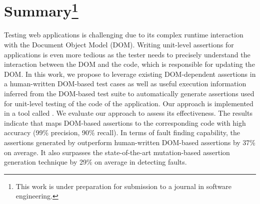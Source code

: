 \section*{Summary\footnote{This work is under preparation for submission to a journal in software engineering.}}
Testing \javascript web applications is challenging due to its complex runtime interaction with the Document Object Model (DOM). Writing unit-level assertions for \javascript applications is even more tedious as the tester needs to precisely understand the interaction between the DOM and the \javascript code, which is responsible for updating the DOM. In this work, we propose to leverage existing DOM-dependent assertions in a human-written DOM-based test cases as well as useful execution information inferred from the DOM-based test suite to automatically generate assertions used for unit-level testing of the \javascript code of the application. Our approach is implemented in a tool called \atrina. We evaluate our approach to assess its effectiveness. The results indicate that \atrina maps DOM-based assertions to the corresponding \javascript code with high accuracy (99\% precision, 90\% recall). In terms of fault finding capability, the assertions generated by \atrina outperform human-written DOM-based assertions by 37\% on average. It also surpasses the state-of-the-art mutation-based assertion generation technique by 29\% on average in detecting faults.